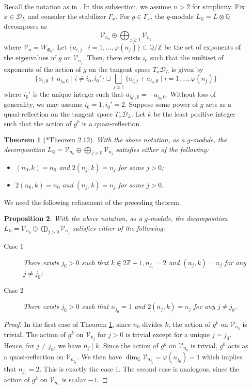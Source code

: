 \documentclass[11pt]{amsart}
\theoremstyle{plain}
\newtheorem{thm}{Theorem}[section]
\newtheorem{prop}[thm]{Proposition}
\theoremstyle{definition}
\numberwithin{equation}{section}
\def\dim{\mathop{\mathrm{dim}}\nolimits}
\newcommand{\bbQ}{\mathbb{Q}}
\newcommand{\bbZ}{\mathbb{Z}}
\newcommand{\calV}{\mathcal{V}}
\begin{document}
Recall the notation as in \cite{Gritsenko2007kodaira}.
In this subsection, we assume $n>2$ for simplicity.
Fix $x \in \mathcal{D}_L$ and consider the stabilizer $\Gamma_x$.
For $g \in \Gamma_x$, the $g$-module $L_\bbQ = L \otimes \bbQ$ decomposes as
\[
\calV_{n_0} \oplus \bigoplus_{j \geq 1} \calV_{n_j}
\]
where $\calV_n = W_{\Phi_n}$.
Let $\{a_{i,j} \mid i = 1,\ldots,\varphi(n_j)\} \subset \bbQ/\bbZ$ be the set of exponents of the eigenvalues of $g$ on $\calV_{n_j}$.
Then, there exists $i_0$ such that the multiset of exponents of the action of $g$ on the tangent space $T_x \mathcal{D}_L$ is given by
\[
\{a_{i,0} + a_{i_0,0} \mid i \neq i_0,i_0'\} \sqcup \bigsqcup_{j \geq 1}\{a_{i, j} + a_{i_0,0} \mid i = 1,\ldots,\varphi(n_j)\}
\]
where $i_0'$ is the unique integer such that $a_{i_0',0}=-a_{i_0,0}$.
Without loss of generality, we may assume $i_0 = 1, i_0'=2$.
Suppose some power of $g$ acts as a quasi-reflection on the tangent space $T_x\mathcal{D}_L$.
Let $k$ be the least positive integer such that the action of $g^k$ is a quasi-reflection.
\begin{thm}[{\cite{Gritsenko2007kodaira}*{Theorem 2.12}}]
\label{thm:GHS_2.12}
    With the above notation, as a $g$-module, the decomposition $L_\bbQ = \calV_{n_0} \oplus \bigoplus_{j>0} \calV_{n_j}$ satisfies either of the following:
    \begin{itemize}
        \item $(n_0,k)=n_0$ and $2(n_j,k)=n_j$ for some $j>0$;
        \item $2(n_0,k)=n_0$ and $(n_j,k)=n_j$ for some $j>0$.
    \end{itemize}
\end{thm}
We need the following refinement of the preceding theorem.
\begin{prop}\label{prop_decomp_L_quasi_ref}
    With the above notation, as a $g$-module, the decomposition $L_\bbQ = \calV_{n_0} \oplus \bigoplus_{j>0} \calV_{n_j}$ satisfies either of the following:
    \begin{description}
        \item[Case 1] There exists $j_0 > 0$ such that $k \in 2\bbZ+1, n_{j_0} = 2$ and $(n_{j}, k) = n_{j}$ for any $j \neq j_0$;
        \item[Case 2]  There exists $j_0 > 0$ such that $n_{j_0} = 1$ and $2(n_{j}, k) = n_{j}$ for any $j \neq j_0$.
    \end{description}
\end{prop}
\begin{proof}
    In the first case of Theorem \ref{thm:GHS_2.12}, since $n_0$ divides $k$, the action of $g^k$ on $\calV_{n_0}$ is trivial.
    The action of $g^k$ on $\calV_{n_j}$ for $j > 0$ is trivial except for a unique $j = j_0$.
    Hence, for $j \neq j_0$, we have $n_j \mid k$.
    Since the action of $g^k$ on $\calV_{n_0}$ is trivial, $g^k$ acts as a quasi-reflection on $\calV_{n_{j_0}}$.
    We then have $\dim_\bbQ \calV_{n_{j_0}} = \varphi(n_{j_0}) = 1$ which implies that $n_{j_0} = 2$.
    This is exactly the case 1.
    The second case is analogous, since the action of $g^k$ on $\calV_{n_0}$ is scalar $-1$.
\end{proof}
\end{document}
